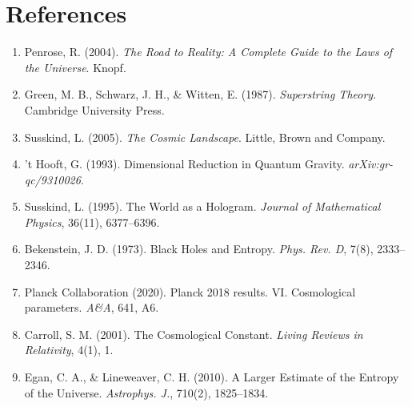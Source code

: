\documentclass[12pt]{article}
\begin{document}
\section*{References}
\begin{enumerate}
\item Penrose, R. (2004). \textit{The Road to Reality: A Complete Guide to the Laws of the Universe}. Knopf.
\item Green, M. B., Schwarz, J. H., \& Witten, E. (1987). \textit{Superstring Theory}. Cambridge University Press.
\item Susskind, L. (2005). \textit{The Cosmic Landscape}. Little, Brown and Company.
\item 't Hooft, G. (1993). Dimensional Reduction in Quantum Gravity. \textit{arXiv:gr-qc/9310026}.
\item Susskind, L. (1995). The World as a Hologram. \textit{Journal of Mathematical Physics}, 36(11), 6377--6396.
\item Bekenstein, J. D. (1973). Black Holes and Entropy. \textit{Phys. Rev. D}, 7(8), 2333--2346.
\item Planck Collaboration (2020). Planck 2018 results. VI. Cosmological parameters. \textit{A\&A}, 641, A6.
\item Carroll, S. M. (2001). The Cosmological Constant. \textit{Living Reviews in Relativity}, 4(1), 1.
\item Egan, C. A., \& Lineweaver, C. H. (2010). A Larger Estimate of the Entropy of the Universe. \textit{Astrophys. J.}, 710(2), 1825--1834.
\end{enumerate}
\end{document}
